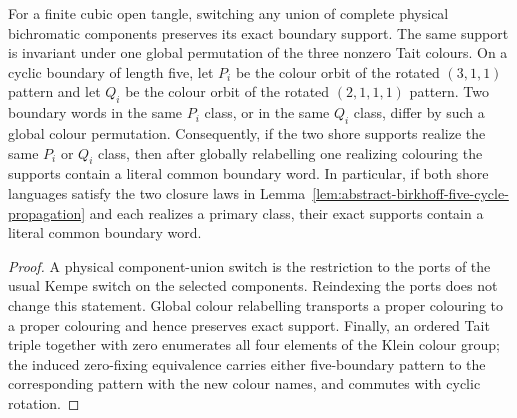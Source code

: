 \begin{lemma}
\label{lem:five-cycle-class-support-semantics}
For a finite cubic open tangle, switching any union of complete physical
bichromatic components preserves its exact boundary support.  The same support
is invariant under one global permutation of the three nonzero Tait colours.
On a cyclic boundary of length five, let $P_i$ be the colour orbit of the
rotated $(3,1,1)$ pattern and let $Q_i$ be the colour orbit of the rotated
$(2,1,1,1)$ pattern.  Two boundary words in the same $P_i$ class, or in the
same $Q_i$ class, differ by such a global colour permutation.  Consequently,
if the two shore supports realize the same $P_i$ or $Q_i$ class, then after
globally relabelling one realizing colouring the supports contain a literal
common boundary word.  In particular, if both shore languages satisfy the two
closure laws in
Lemma~\ref{lem:abstract-birkhoff-five-cycle-propagation} and each realizes a
primary class, their exact supports contain a literal common boundary word.
\end{lemma}

\begin{proof}
A physical component-union switch is the restriction to the ports of the
usual Kempe switch on the selected components.  Reindexing the ports does not
change this statement.  Global colour relabelling transports a proper
colouring to a proper colouring and hence preserves exact support.  Finally,
an ordered Tait triple together with zero enumerates all four elements of the
Klein colour group; the induced zero-fixing equivalence carries either
five-boundary pattern to the corresponding pattern with the new colour names,
and commutes with cyclic rotation.
\end{proof}

